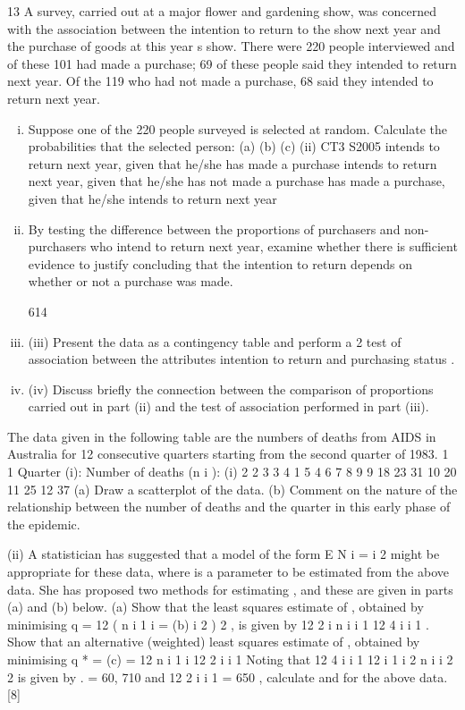 \documentclass[a4paper,12pt]{article}
\begin{document}
13
A survey, carried out at a major flower and gardening show, was concerned with the association between the intention to return to the show next year and the purchase of goods at this year s show. There were 220 people interviewed and of these 101 had
made a purchase; 69 of these people said they intended to return next year. Of the 119 who had not made a purchase, 68 said they intended to return next year.
\begin{enumerate}[(i)]
\item Suppose one of the 220 people surveyed is selected at random.
Calculate the probabilities that the selected person:
(a)
(b)
(c)
(ii)
CT3 S2005
intends to return next year, given that he/she has made a purchase
intends to return next year, given that he/she has not made a purchase
has made a purchase, given that he/she intends to return next year

\item By testing the difference between the proportions of purchasers and non-purchasers who intend to return next year, examine whether there is sufficient evidence to justify concluding that the intention to return depends on whether
or not a purchase was made.

614
\item (iii) Present the data as a contingency table and perform a 2 test of association between the attributes intention to return and purchasing status .
\item
(iv) Discuss briefly the connection between the comparison of proportions carried out in part (ii) and the test of association performed in part (iii).
\end{enumerate}

The data given in the following table are the numbers of deaths from AIDS in
Australia for 12 consecutive quarters starting from the second quarter of 1983.
1
1
Quarter (i):
Number of deaths (n i ):
(i)
2
2
3
3
4
1
5
4
6 7 8 9
9 18 23 31
10
20
11
25
12
37
(a) Draw a scatterplot of the data.
(b) Comment on the nature of the relationship between the number of
deaths and the quarter in this early phase of the epidemic.

(ii)
A statistician has suggested that a model of the form
E N i = i 2
might be appropriate for these data, where is a parameter to be estimated
from the above data. She has proposed two methods for estimating , and
these are given in parts (a) and (b) below.
(a)
Show that the least squares estimate of , obtained by minimising
q =
12
( n
i 1 i
=
(b)
i 2 ) 2 , is given by
12 2
i n i
i 1
12 4
i
i 1
.
Show that an alternative (weighted) least squares estimate of ,
obtained by minimising q * =
(c)
= 12
n
i 1 i
12 2
i
i 1
Noting that 12 4
i
i 1
12
i 1
i 2
n i
i 2
2
is given by
.
= 60, 710 and
12 2
i
i 1
= 650 , calculate
and
for the above data.
[8]
\end{document}
